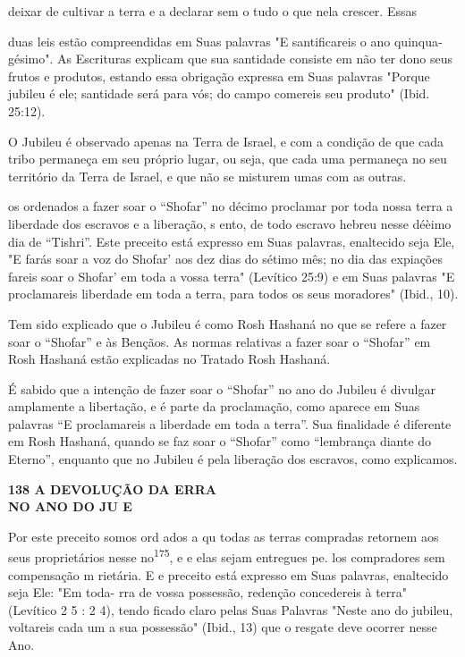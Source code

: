 deixar de cultivar a terra e a declarar sem o tudo o que nela crescer.
Essas

duas leis estão compreendidas em Suas palavras "E santificareis o ano
quinqua­gésimo". As Escrituras explicam que sua santidade consiste em
não ter dono seus frutos e produtos, estando essa obrigação expressa em
Suas palavras "Por­que jubileu é ele; santidade será para vós; do campo
comereis seu produto" (Ibid. 25:12).

O Jubileu é observado apenas na Terra de Israel, e com a condição de que
cada tribo permaneça em seu próprio lugar, ou seja, que cada uma
per­maneça no seu território da Terra de Israel, e que não se misturem
umas com as outras.

os ordenados a fazer soar o ``Shofar'' no décimo proclamar por toda nossa
terra a liberdade dos escravos e a liberação, s ento, de todo escravo
hebreu nesse déèimo dia de ``Tishri''. Este preceito está expresso em Suas
palavras, enaltecido seja Ele, "E farás soar a voz do Shofar' aos dez
dias do sétimo mês; no dia das expiações fa­reis soar o Shofar' em toda
a vossa terra" (Levítico 25:9) e em Suas palavras "E proclamareis
liberdade em toda a terra, para todos os seus moradores" (Ibid., 10).

Tem sido explicado que o Jubileu é como Rosh Hashaná no que se refere a
fazer soar o ``Shofar'' e às Bençãos. As normas relativas a fazer soar o
``Shofar'' em Rosh Hashaná estão explicadas no Tratado Rosh Hashaná.

É sabido que a intenção de fazer soar o ``Shofar'' no ano do Jubileu é
divulgar amplamente a libertação, e é parte da proclamação, como aparece
em Suas palavras ``E proclamareis a liberdade em toda a terra''. Sua
finalidade é diferente em Rosh Hashaná, quando se faz soar o ``Shofar''
como ``lembrança diante do Eterno'', enquanto que no Jubileu é pela
liberação dos escravos, co­mo explicamos.


\textbf{138 A DEVOLUÇÃO DA ERRA\\
NO ANO DO JU E}


Por este preceito somos ord ados a qu todas as terras compradas retornem
aos seus proprietários nesse no\textsuperscript{175}, e e elas sejam
entregues pe­. los compradores sem compensação m rietária. E e preceito
está expresso em Suas palavras, enaltecido seja Ele: "Em toda- rra de
vossa possessão, reden­ção concedereis à terra" (Levítico 2 5 : 2 4),
tendo ficado claro pelas Suas Pala­vras "Neste ano do jubileu, voltareis
cada um a sua possessão" (Ibid., 13) que o resgate deve ocorrer nesse
Ano.



